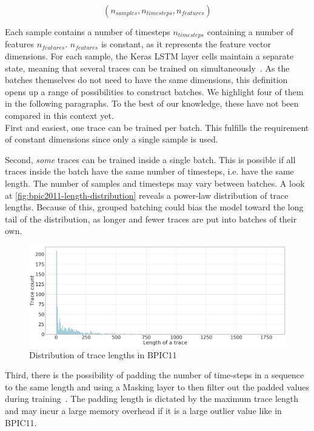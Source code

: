 $$(n_{samples}, n_{timesteps}, n_{features})$$

Each sample contains a number of timesteps $n_{timesteps}$ containing a number of features $n_{features}$. $n_{features}$ is constant, as it represents the feature vector dimensions. For each sample, the Keras LSTM layer cells maintain a separate state, meaning that several traces can be trained on simultaneously~\cite{web:keras-lstm-state}. As the batches themselves do not need to have the same dimensions, this definition opens up a range of possibilities to construct batches. We highlight four of them in the following paragraphs. To the best of our knowledge, these have not been compared in this context yet.\\

First and easiest, one trace can be trained per batch. This fulfills the requirement of constant dimensions since only a single sample is used.

Second, \textit{some} traces can be trained inside a single batch. This is possible if all traces inside the batch have the same number of timesteps, i.e. have the same length. The number of samples and timesteps may vary between batches. A look at \autoref{fig:bpic2011-length-distribution} reveals a power-law distribution of trace lengths. Because of this, grouped batching could bias the model toward the long tail of the distribution, as longer and fewer traces are put into batches of their own.

\begin{figure}[ht!]
    \centering
    \includegraphics[width=.9\textwidth]{gfx/frequency-distribution.png}
    \caption{Distribution of trace lengths in BPIC11}
    \label{fig:bpic2011-length-distribution}
\end{figure}

Third, there is the possibility of padding the number of time-steps in a sequence to the same length and using a Masking layer to then filter out the padded values during training~\cite{web:keras}. The padding length is dictated by the maximum trace length and may incur a large memory overhead if it is a large outlier value like in BPIC11.

